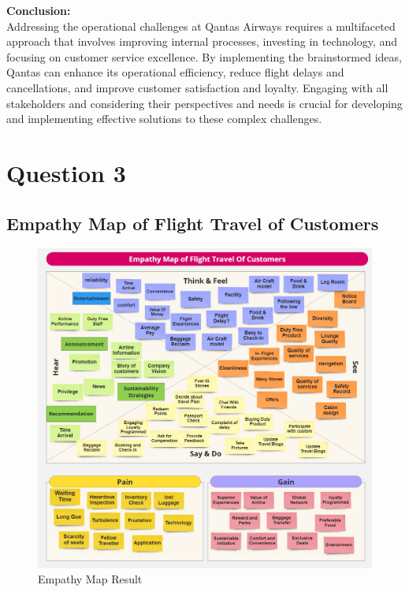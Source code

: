 \documentclass[12pt,a4paper]{article}
\begin{document}
\noindent\textbf{Conclusion:}\\
\noindent Addressing the operational challenges at Qantas Airways requires a multifaceted approach that involves improving internal processes, investing in technology, and focusing on customer service excellence. By implementing the brainstormed ideas, Qantas can enhance its operational efficiency, reduce flight delays and cancellations, and improve customer satisfaction and loyalty. Engaging with all stakeholders and considering their perspectives and needs is crucial for developing and implementing effective solutions to these complex challenges. \\


\pagebreak

\setcounter{page}{5}

\section{Question 3}
\subsection{Empathy Map of Flight Travel of Customers}
\label{sec:Question 3}
\begin{figure}[htbp]
    \centering
    \includegraphics[width=1.0\textwidth]{Customer Touchpoint Map.jpg}
    \caption{Empathy Map Result}
    \label{fig:example}
\end{figure}



\pagebreak
 



	
\def\UrlBreaks{\do\/\do-}

\clearpage
\end{document}
